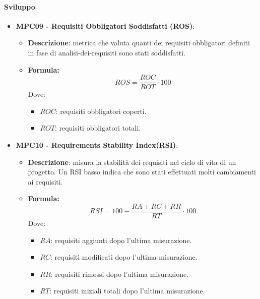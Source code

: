 \documentclass[10pt]{article}
\begin{document}
\begin{justify}
\paragraph{Sviluppo}
\begin{itemize}
\item   \textbf{MPC09 - Requisiti Obbligatori Soddisfatti (ROS)}:
            \begin{itemize}
                \item   \textbf{Descrizione}: metrica che valuta quanti dei requisiti obbligatori definiti in fase di analisi-dei-requisiti sono stati soddisfatti.
                \item   \textbf{Formula:}
                        \[
                        ROS = \frac{ROC}{ROT} \cdot 100
                        \]
                        Dove:
                        \begin{itemize}
                            \item $ROC$: requisiti obbligatori coperti.
                            \item $ROT$: requisiti obbligatori totali.
                        \end{itemize}
            \end{itemize}
\item \textbf{MPC10 - Requirements Stability Index(RSI)}:
            \begin{itemize}
                \item   \textbf{Descrizione}: misura la stabilità dei requisiti nel ciclo di vita di un progetto. Un RSI basso indica che sono stati effettuati molti cambiamenti ai requisiti.
                \item   \textbf{Formula:}
                        \[
                        RSI = 100 - \frac{RA+RC+RR}{RT} \cdot 100
                        \]
                        Dove:
                        \begin{itemize}
                            \item $RA$: requisiti aggiunti dopo l'ultima misurazione.
                            \item $RC$: requisiti modificati dopo l'ultima misurazione.
                            \item $RR$: requisiti rimossi dopo l'ultima misurazione.
                            \item $RT$: requisiti iniziali totali dopo l'ultima misurazione.
                        \end{itemize}
            \end{itemize}
            

\end{itemize}
\end{justify}
\end{document}
